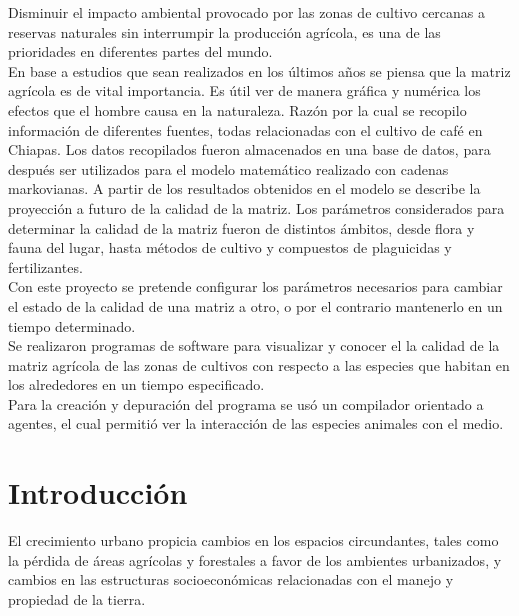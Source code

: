 Disminuir el impacto ambiental provocado por las zonas de cultivo cercanas a reservas naturales sin interrumpir la producción agrícola, es una de las prioridades en diferentes partes del mundo.\\

En base a estudios que sean realizados en los últimos años se piensa que la matriz agrícola es de vital importancia. Es útil ver de manera gráfica y numérica los efectos que el hombre causa en la naturaleza. Razón por la cual se recopilo información de diferentes fuentes, todas relacionadas con el cultivo de café en Chiapas. Los datos recopilados fueron almacenados en una base de datos, para después ser utilizados para el modelo matemático realizado con cadenas markovianas. A partir de los resultados obtenidos en el modelo se describe la proyección a futuro de la calidad de la matriz. Los parámetros considerados para determinar la calidad de la matriz fueron de distintos ámbitos, desde flora y fauna del lugar, hasta métodos de cultivo y compuestos de plaguicidas y fertilizantes. \\

Con este proyecto se pretende configurar los parámetros necesarios para cambiar el estado de la calidad de  una matriz a otro, o por el contrario mantenerlo en un tiempo determinado.\\

Se realizaron programas de software para visualizar y conocer el la calidad de la matriz agrícola de las zonas de cultivos con respecto a las especies que habitan en los alrededores en un tiempo especificado.\\

Para la creación y depuración del programa se usó un compilador orientado a agentes, el cual permitió ver la interacción de las especies animales con el medio.


\section{Introducción}
El crecimiento urbano propicia cambios en los espacios circundantes, tales como la pérdida de áreas agrícolas y forestales a favor de los ambientes urbanizados, y cambios en las estructuras socioeconómicas relacionadas con el manejo y propiedad de la tierra.\\

